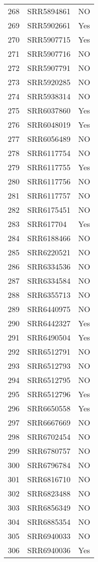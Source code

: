 \begin{table}[ht]
\begin{tabular}{rll}
  268 & SRR5894861 & NO \\ 
  269 & SRR5902661 & Yes \\ 
  270 & SRR5907715 & Yes \\ 
  271 & SRR5907716 & NO \\ 
  272 & SRR5907791 & NO \\ 
  273 & SRR5920285 & NO \\ 
  274 & SRR5938314 & NO \\ 
  275 & SRR6037860 & Yes \\ 
  276 & SRR6048019 & Yes \\ 
  277 & SRR6056489 & NO \\ 
  278 & SRR6117754 & NO \\ 
  279 & SRR6117755 & Yes \\ 
  280 & SRR6117756 & NO \\ 
  281 & SRR6117757 & NO \\ 
  282 & SRR6175451 & NO \\ 
  283 & SRR617704 & Yes \\ 
  284 & SRR6188466 & NO \\ 
  285 & SRR6220521 & NO \\ 
  286 & SRR6334536 & NO \\ 
  287 & SRR6334584 & NO \\ 
  288 & SRR6355713 & NO \\ 
  289 & SRR6440975 & NO \\ 
  290 & SRR6442327 & Yes \\ 
  291 & SRR6490504 & Yes \\ 
  292 & SRR6512791 & NO \\ 
  293 & SRR6512793 & NO \\ 
  294 & SRR6512795 & NO \\ 
  295 & SRR6512796 & Yes \\ 
  296 & SRR6650558 & Yes \\ 
  297 & SRR6667669 & NO \\ 
  298 & SRR6702454 & NO \\ 
  299 & SRR6780757 & NO \\ 
  300 & SRR6796784 & NO \\ 
  301 & SRR6816710 & NO \\ 
  302 & SRR6823488 & NO \\ 
  303 & SRR6856349 & NO \\ 
  304 & SRR6885354 & NO \\ 
  305 & SRR6940033 & NO \\ 
  306 & SRR6940036 & Yes \\ 

\end{tabular}
\end{table}
